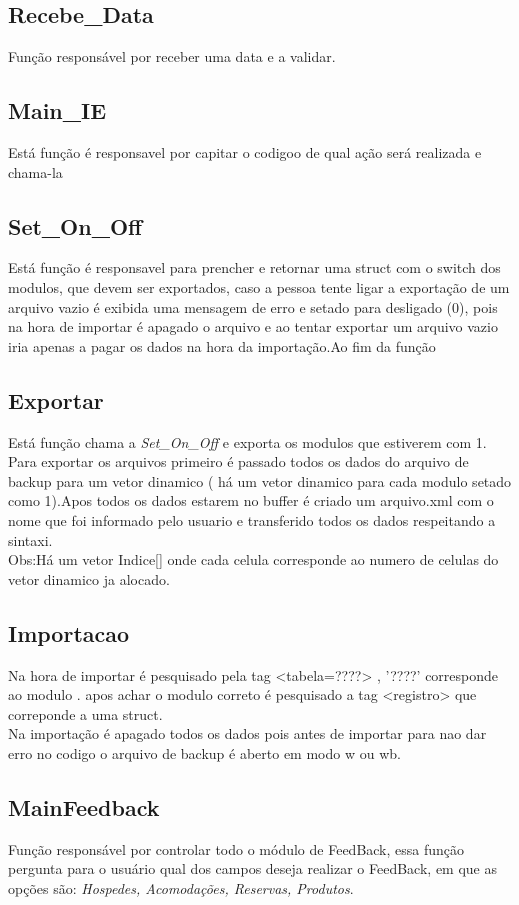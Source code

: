 \documentclass{article}
\begin{document}
\subsection{Recebe\_Data}
	Função responsável por receber uma data e a validar.
	

\subsection{Main\_IE}
	Está função é responsavel por capitar o codigoo de qual ação será realizada e chama-la

\subsection{Set\_On\_Off}
	Está função é responsavel para prencher  e retornar uma struct com o switch dos modulos, que devem ser exportados, caso a pessoa tente ligar a exportação de um arquivo vazio é exibida uma mensagem de erro e setado para desligado (0), pois na hora de  importar é apagado o arquivo e ao tentar exportar um arquivo vazio iria apenas a pagar os dados na hora da importação.Ao fim da função 

\subsection{Exportar}
	Está função chama  a \textit{Set\_On\_Off} e exporta os modulos que estiverem com 1. Para exportar os arquivos primeiro é passado todos os dados  do arquivo de backup para um vetor dinamico ( há um vetor dinamico para cada modulo setado como 1).Apos todos os dados estarem no buffer é criado um arquivo.xml com o nome que foi informado pelo usuario e transferido todos os dados respeitando a sintaxi.\\
	Obs:Há um vetor Indice[] onde cada celula corresponde ao numero de celulas do vetor dinamico ja alocado.

\subsection{Importacao}
	Na hora de importar é pesquisado pela tag <tabela=????>  , '????' corresponde ao modulo . apos achar o modulo correto é pesquisado a tag <registro> que correponde a uma struct.\\
	Na importação é apagado todos os dados pois antes de importar para nao dar erro no codigo o arquivo de backup é aberto em modo w ou wb.	
	
	
\subsection{MainFeedback}
	Função responsável por controlar todo o módulo de FeedBack, essa função pergunta para o usuário qual dos campos deseja realizar o FeedBack, em que as opções são:  \textit{Hospedes, Acomodações, Reservas, Produtos}.
\end{document}
